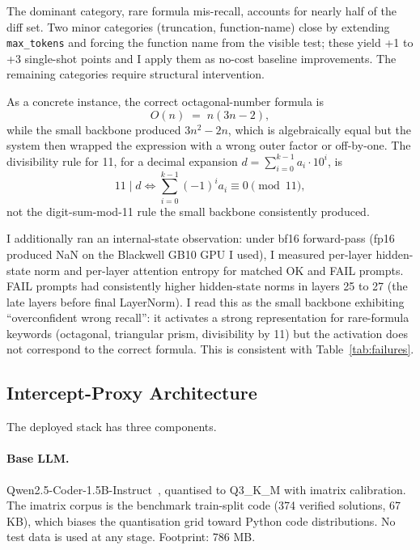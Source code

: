 \documentclass[11pt,a4paper]{article}
\begin{document}
The dominant category, rare formula mis-recall, accounts for nearly half of the diff set. Two minor categories (truncation, function-name) close by extending \texttt{max\_tokens} and forcing the function name from the visible test; these yield +1 to +3 single-shot points and I apply them as no-cost baseline improvements. The remaining categories require structural intervention.

As a concrete instance, the correct octagonal-number formula is
\begin{equation}
O(n) \;=\; n(3n - 2),
\label{eq:oct}
\end{equation}
while the small backbone produced $3n^2 - 2n$, which is algebraically equal but the system then wrapped the expression with a wrong outer factor or off-by-one. The divisibility rule for 11, for a decimal expansion $d = \sum_{i=0}^{k-1} a_i \cdot 10^i$, is
\begin{equation}
11 \mid d \iff \sum_{i=0}^{k-1} (-1)^i a_i \equiv 0 \pmod{11},
\label{eq:div11}
\end{equation}
not the digit-sum-mod-11 rule the small backbone consistently produced.

I additionally ran an internal-state observation: under bf16 forward-pass (fp16 produced NaN on the Blackwell GB10 GPU I used), I measured per-layer hidden-state norm and per-layer attention entropy for matched OK and FAIL prompts. FAIL prompts had consistently higher hidden-state norms in layers 25 to 27 (the late layers before final LayerNorm). I read this as the small backbone exhibiting ``overconfident wrong recall'': it activates a strong representation for rare-formula keywords (octagonal, triangular prism, divisibility by 11) but the activation does not correspond to the correct formula. This is consistent with Table~\ref{tab:failures}.

\subsection{Intercept-Proxy Architecture}
\label{sec:arch}

The deployed stack has three components.

\paragraph{Base LLM.}
Qwen2.5-Coder-1.5B-Instruct~\cite{qwencoder}, quantised to Q3\_K\_M with imatrix calibration. The imatrix corpus is the benchmark train-split code (374 verified solutions, 67 KB), which biases the quantisation grid toward Python code distributions. No test data is used at any stage. Footprint: 786 MB.
\end{document}
